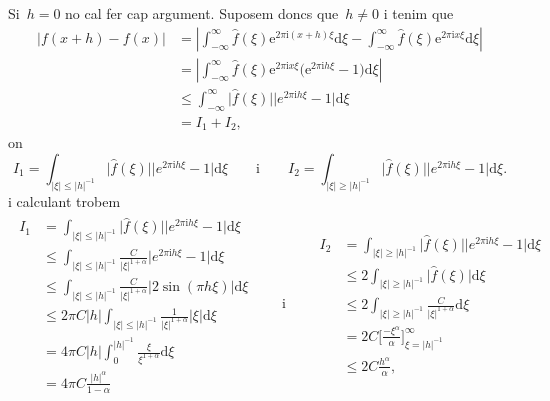 \documentclass[a4paper]{article}
\theoremstyle{definition}
\newcommand{\iu}{\mathrm{i}}
\newcommand{\e}{\mathrm{e}}
\newcommand{\uppi}{\pi}
\newcommand{\diff}{\mathrm{d}}
\newcommand{\abs}[1]{\lvert{#1}\rvert}
\newcommand{\Abs}[1]{\left\lvert{#1}\right\rvert}
\begin{document}
Si~\(h=0\) no cal fer cap argument.
Suposem doncs que~\(h\neq0\) i tenim que
\begin{align*}
    \abs{f(x+h) - f(x)} &= \Abs{\int_{-\infty}^{\infty}
                           \widehat{f}(\xi)\e^{2\uppi\iu(x+h)\xi}\diff\xi
                         - \int_{-\infty}^{\infty}
                           \widehat{f}(\xi)\e^{2\uppi\iu x\xi}\diff\xi} \\
                        &= \Abs{\int_{-\infty}^{\infty}
                           \widehat{f}(\xi)\e^{2\uppi\iu x\xi}
                           \bigl(\e^{2\uppi\iu h\xi}-1\bigr)
                           \diff\xi} \\
                        &\leq \int_{-\infty}^{\infty}
                           \abs{\widehat{f}(\xi)}\abs{e^{2\uppi\iu h\xi}-1}
                           \diff\xi \\
                        &= I_{1} + I_{2},
\end{align*}
on
\[
    I_{1} = \int_{\abs{\xi}\leq\abs{h}^{-1}}
    \abs{\widehat{f}(\xi)}\abs{e^{2\uppi\iu h\xi}-1} \diff\xi
    \qquad\text{i}\qquad
    I_{2} = \int_{\abs{\xi}\geq\abs{h}^{-1}}
    \abs{\widehat{f}(\xi)}\abs{e^{2\uppi\iu h\xi}-1} \diff\xi.
\]
i calculant trobem
\begin{gather*}
   \begin{split}
    I_{1} &= \int_{\abs{\xi}\leq\abs{h}^{-1}}
             \abs{\widehat{f}(\xi)}\abs{e^{2\uppi\iu h\xi}-1}
             \diff\xi \\
          &\leq \int_{\abs{\xi}\leq\abs{h}^{-1}}
             \frac{C}{\abs{\xi}^{1+\alpha}}
             \abs{e^{2\uppi\iu h\xi}-1}
             \diff\xi \\
          &\leq \int_{\abs{\xi}\leq\abs{h}^{-1}}
             \frac{C}{\abs{\xi}^{1+\alpha}}
             \abs{2\sin(\uppi h\xi)}
             \diff\xi \\
          &\leq 2\uppi C\abs{h}
             \int_{\abs{\xi}\leq\abs{h}^{-1}}
             \frac{1}{\abs{\xi}^{1+\alpha}}\abs{\xi}
             \diff\xi \\
          &= 4\uppi C\abs{h}
             \int_{0}^{\abs{h}^{-1}}
             \frac{\xi}{\xi^{1+\alpha}}
             \diff\xi \\
          &= 4\uppi C\frac{\abs{h}^{\alpha}}{1-\alpha}
    \end{split}
    \qquad\text{i}\qquad
    \begin{split}
    I_{2} &= \int_{\abs{\xi}\geq\abs{h}^{-1}}
             \abs{\widehat{f}(\xi)}\abs{e^{2\uppi\iu h\xi}-1}
             \diff\xi \\
          &\leq 2\int_{\abs{\xi}\geq\abs{h}^{-1}}
                \abs{\widehat{f}(\xi)}\diff\xi \\
          &\leq 2\int_{\abs{\xi}\geq\abs{h}^{-1}}
                \frac{C}{\abs{\xi}^{1+\alpha}} \diff\xi \\
          &= 2C
          \biggl[\frac{-\xi^{\alpha}}{\alpha}\biggr]_{\xi=\abs{h}^{-1}}^{\infty} \\
          &\leq 2C\frac{h^{\alpha}}{\alpha},
    \end{split}
\end{gather*}
\end{document}
